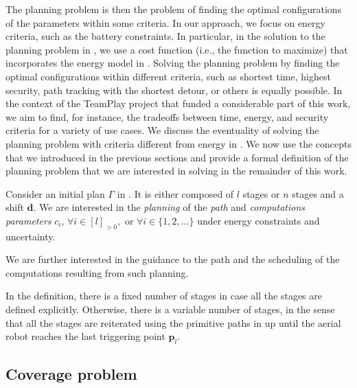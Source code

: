 The planning problem is then the problem of finding the optimal configurations of the parameters within some criteria. In our approach, we focus on energy criteria, such as the battery constraints. In particular, in the solution to the planning problem in , we use a cost function (i.e., the function to maximize) that incorporates the energy model in . Solving the planning problem by finding the optimal configurations within different criteria, such as shortest time, highest security, path tracking with the shortest detour, or others is equally possible. In the context of the TeamPlay project that funded a considerable part of this work, we aim to find, for instance, the tradeoffs between time, energy, and security criteria for a variety of use cases. We discuss the eventuality of solving the planning problem with criteria different from energy in . We now use the concepts that we introduced in the previous sections and provide a formal definition of the planning problem that we are interested in solving in the remainder of this work.

\begin{highlight}
\begin{pb}\label{pb}
  Consider an initial plan $\Gamma$ in . It is either composed of $l$ stages or $n$ stages and a shift $\mathbf{d}$. We are interested in the \emph{planning} of the \emph{path} and \emph{computations parameters} $c_i,\,\forall i\in[l]_{>0},$ or $\forall i\in\{1,2,\dots\}$ under energy constraints and uncertainty.
  
  We are further interested in the guidance to the path and the scheduling of the computations resulting from such planning.
\end{pb}    
\end{highlight}

In the definition, there is a fixed number of stages in case all the stages are defined explicitly. Otherwise, there is a variable number of stages, in the sense that all the stages are reiterated using the primitive paths in  up until the aerial robot reaches the last triggering point $\mathbf{p}_l$.


\subsection{Coverage problem}

